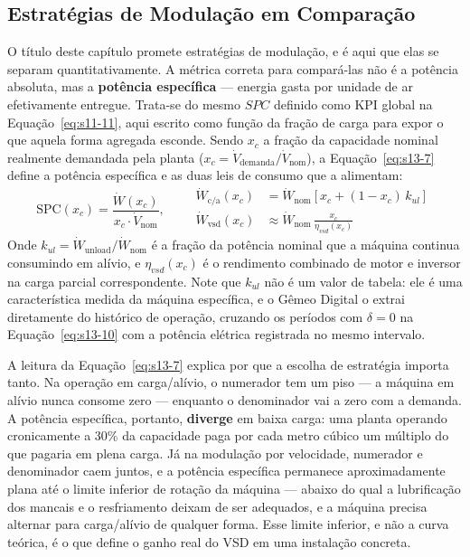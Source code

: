 \documentclass[12pt,a4paper]{article}
\numberwithin{equation}{section}
\numberwithin{table}{section}
\numberwithin{figure}{section}
\begin{document}
	\subsection{\textbf{Estratégias de Modulação em Comparação}}
	O título deste capítulo promete estratégias de modulação, e é aqui que elas se separam quantitativamente. A métrica correta para compará-las não é a potência absoluta, mas a \textbf{potência específica} — energia gasta por unidade de ar efetivamente entregue. Trata-se do mesmo $SPC$ definido como KPI global na Equação~\eqref{eq:s11-11}, aqui escrito como função da fração de carga para expor o que aquela forma agregada esconde. Sendo $x_c$ a fração da capacidade nominal realmente demandada pela planta ($x_c = \dot{V}_{\text{demanda}}/\dot{V}_{\text{nom}}$), a Equação~\eqref{eq:s13-7} define a potência específica e as duas leis de consumo que a alimentam:
	\begin{equation}\label{eq:s13-7}
	\text{SPC}(x_c) = \frac{\dot{W}(x_c)}{x_c \cdot \dot{V}_{\text{nom}}}, \qquad
	\begin{aligned}
	\dot{W}_{\text{c/a}}(x_c) &= \dot{W}_{\text{nom}} \left[ x_c + (1 - x_c) \, k_{ul} \right] \\
	\dot{W}_{\text{vsd}}(x_c) &\approx \dot{W}_{\text{nom}} \, \frac{x_c}{\eta_{vsd}(x_c)}
	\end{aligned}
	\end{equation}
	Onde $k_{ul} = \dot{W}_{\text{unload}}/\dot{W}_{\text{nom}}$ é a fração da potência nominal que a máquina continua consumindo em alívio, e $\eta_{vsd}(x_c)$ é o rendimento combinado de motor e inversor na carga parcial correspondente. Note que $k_{ul}$ não é um valor de tabela: ele é uma característica medida da máquina específica, e o Gêmeo Digital o extrai diretamente do histórico de operação, cruzando os períodos com $\delta = 0$ na Equação~\eqref{eq:s13-10} com a potência elétrica registrada no mesmo intervalo.

	A leitura da Equação~\eqref{eq:s13-7} explica por que a escolha de estratégia importa tanto. Na operação em carga/alívio, o numerador tem um piso — a máquina em alívio nunca consome zero — enquanto o denominador vai a zero com a demanda. A potência específica, portanto, \textbf{diverge} em baixa carga: uma planta operando cronicamente a 30\% da capacidade paga por cada metro cúbico um múltiplo do que pagaria em plena carga. Já na modulação por velocidade, numerador e denominador caem juntos, e a potência específica permanece aproximadamente plana até o limite inferior de rotação da máquina — abaixo do qual a lubrificação dos mancais e o resfriamento deixam de ser adequados, e a máquina precisa alternar para carga/alívio de qualquer forma. Esse limite inferior, e não a curva teórica, é o que define o ganho real do VSD em uma instalação concreta.
\end{document}
